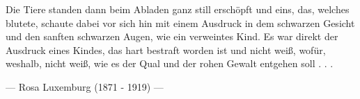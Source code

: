 \cleardoublepage\null

\vspace*{\fill}

\begin{center}

	\quad

	\it

	Die Tiere standen dann beim Abladen ganz still erschöpft und
	eins, das, welches blutete, schaute dabei vor sich hin mit einem
	Ausdruck in dem schwarzen Gesicht und den sanften schwarzen Augen,
	wie ein verweintes Kind. Es war direkt der Ausdruck eines Kindes,
	das hart bestraft worden ist und nicht weiß, wofür, weshalb,
	nicht weiß, wie es der Qual und der rohen Gewalt entgehen soll
	. . .

	--- Rosa Luxemburg (1871 - 1919) \cite{lux20} ---

\end{center}

\vspace*{\fill}
